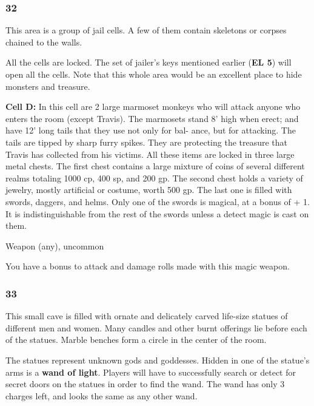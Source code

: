 \documentclass[palace_of_the_silver_princess]{subfiles}
\begin{document}
\subsubsection{32}
\begin{quotebox}
    This area is a group of jail cells. A few of them contain skeletons
    or corpses chained to the walls.
\end{quotebox}

All the cells are locked. The set of jailer’s keys mentioned earlier
(\textbf{EL 5}) will open all the cells. Note that this whole area would be an
excellent place to hide monsters and treasure.

\textbf{Cell D:} In this cell are 2 large marmoset monkeys who will
attack anyone who enters the room (except Travis). The marmosets stand
8’ high when erect; and have 12’ long tails that they use not only for
bal- ance, but for attacking. The tails are tipped by sharp furry
spikes. They are protecting the treasure that Travis has collected
from his victims. All these items are locked in three large metal
chests. The first chest contains a large mixture of coins of several
different realms totaling 1000 cp, 400 sp, and 200 gp. The second chest
holds a variety of jewelry, mostly artificial or costume, worth 500 gp.
The last one is filled with swords, daggers, and helms. Only one of the
swords is magical, at a bonus of + 1. It is indistinguishable from the
rest of the swords unless a detect magic is cast on them.

{Weapon (any), uncommon}

You have a bonus to attack and damage rolls made with this magic weapon.

\subsubsection{33}
\begin{quotebox}
    This small cave is filled with ornate and delicately carved
    life-size statues of different men and women. Many candles and other
    burnt offerings lie before each of the statues. Marble benches form
    a circle in the center of the room.
\end{quotebox}

The statues represent unknown gods and goddesses. Hidden in one of the
statue’s arms is a \textbf{wand of light}. Players will have to
successfully search or detect for secret doors on the statues in order
to find the wand. The wand has only 3 charges left, and looks the same
as any other wand.
\end{document}
